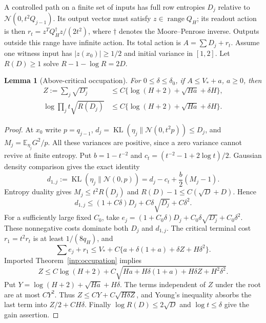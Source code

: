 \documentclass[11pt]{article}
\newtheorem{lemma}{Lemma}
\newcommand{\E}{\mathbb E}
\newcommand{\KL}{\operatorname{KL}}
\begin{document}
A controlled path on a finite set of inputs has full row entropies
$D_j$ relative to $\mathcal N(0,t^2Q_{j-1})$. Its output vector must satisfy
$z\in\operatorname{range}Q_H$; its readout action is then
$r_t=z^TQ_H^\dagger z/(2t^2)$, where $\dagger$ denotes the
Moore--Penrose inverse. Outputs outside this range have infinite action.
Its total action is $A=\sum D_j+r_t$.
Assume one witness input has $|z(x_0)|\ge1/2$ and initial variance in
$[1,2]$. Let $R(D)\ge1$ solve $R-1-\log R=2D$.

\begin{lemma}[Above-critical occupation]\label{lem:gain}
For $0\le\delta\le\delta_0$, if $A\le V_*+a$, $a\ge0$, then
\begin{align}
 Z:=\sum_j\sqrt{D_j}&\le C\{\log(H+2)+\sqrt{Ha}+\delta H\},\label{eq:Z}\\
 \log\prod_jt\sqrt{R(D_j)}&\le C\{\log(H+2)+\sqrt{Ha}+\delta H\}.
\end{align}
\end{lemma}
\begin{proof}
At $x_0$ write $p=q_{j-1}$, $d_j=\KL(\eta_j\|\mathcal N(0,t^2p))
\le D_j$, and $M_j=\E_{\eta_j}G^2/p$. All these variances are positive,
since a zero variance cannot revive at finite entropy. Put
$b=1-t^{-2}$ and $c_t=(t^{-2}-1+2\log t)/2$. Gaussian density comparison
gives the exact identity
\begin{equation}\label{eq:reference}
 d_{1,j}:=\KL(\eta_j\|\mathcal N(0,p))
   =d_j-c_t+\frac b2(M_j-1).
\end{equation}
Entropy duality gives $M_j\le t^2R(D_j)$ and
$R(D)-1\le C(\sqrt D+D)$. Hence
\[
 d_{1,j}\le(1+C\delta)D_j+C\delta\sqrt{D_j}+C\delta^2.
\]
For a sufficiently large fixed $C_0$, take
$e_j=(1+C_0\delta)D_j+C_0\delta\sqrt{D_j}+C_0\delta^2$.
These nonnegative costs dominate both $D_j$ and $d_{1,j}$.
The critical terminal cost $r_1=t^2r_t$ is at least $1/(8q_H)$, and
\[
 \sum e_j+r_1\le V_*+C\{a+\delta(1+a)+\delta Z+H\delta^2\}.
\]
Imported Theorem~\ref{inp:occupation} implies
\[
 Z\le C\log(H+2)+C\sqrt{Ha+H\delta(1+a)+H\delta Z+H^2\delta^2}.
\]
Put $Y=\log(H+2)+\sqrt{Ha}+H\delta$. The terms independent of $Z$
under the root are at most $CY^2$. Thus
$Z\le CY+C\sqrt{H\delta Z}$, and Young's inequality absorbs the last
term into $Z/2+CH\delta$. Finally $\log R(D)\le2\sqrt D$ and
$\log t\le\delta$ give the gain assertion.
\end{proof}
\end{document}
